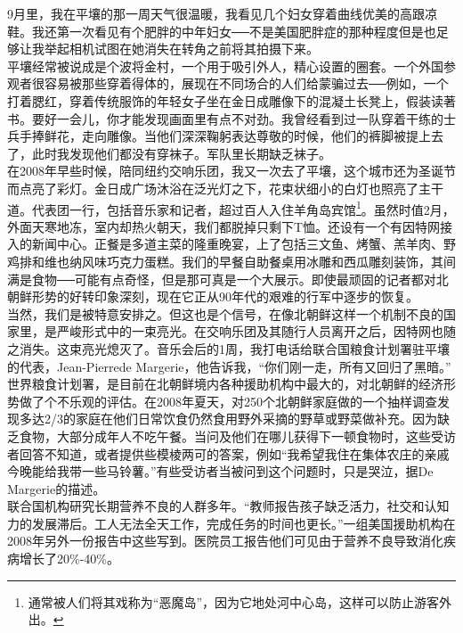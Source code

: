 9月里，我在平壤的那一周天气很温暖，我看见几个妇女穿着曲线优美的高跟凉鞋。我还第一次看见有个肥胖的中年妇女──不是美国肥胖症的那种程度但是也足够让我举起相机试图在她消失在转角之前将其拍摄下来。\\

平壤经常被说成是个波将金村，一个用于吸引外人，精心设置的圈套。一个外国参观者很容易被那些穿着得体的，展现在不同场合的人们给蒙骗过去──例如，一个打着腮红，穿着传统服饰的年轻女子坐在金日成雕像下的混凝土长凳上，假装读著书。要好一会儿，你才能发现画面里有点不对劲。我曾经看到过一队穿着干练的士兵手捧鲜花，走向雕像。当他们深深鞠躬表达尊敬的时候，他们的裤脚被提上去了，此时我发现他们都没有穿袜子。军队里长期缺乏袜子。\\

在2008年早些时候，陪同纽约交响乐团，我又一次去了平壤，这个城市还为圣诞节而点亮了彩灯。金日成广场沐浴在泛光灯之下，花束状细小的白灯也照亮了主干道。代表团一行，包括音乐家和记者，超过百人入住羊角岛宾馆\footnote{通常被人们将其戏称为“恶魔岛”，因为它地处河中心岛，这样可以防止游客外出。}。虽然时值2月，外面天寒地冻，室内却热火朝天，我们都脱掉只剩下T恤。还设有一个有因特网接入的新闻中心。正餐是多道主菜的隆重晚宴，上了包括三文鱼、烤蟹、羔羊肉、野鸡排和维也纳风味巧克力蛋糕。我们的早餐自助餐桌用冰雕和西瓜雕刻装饰，其间满是食物──可能有点奇怪，但是那可真是一个大展示。即使最顽固的记者都对北朝鲜形势的好转印象深刻，现在它正从90年代的艰难的行军中逐步的恢复。\\

当然，我们是被特意安排之。但这也是个信号，在像北朝鲜这样一个机制不良的国家里，是严峻形式中的一束亮光。在交响乐团及其随行人员离开之后，因特网也随之消失。这束亮光熄灭了。音乐会后的1周，我打电话给联合国粮食计划署驻平壤的代表，Jean-Pierrede Margerie，他告诉我，“你们刚一走，所有又回归了黑暗。”\\

世界粮食计划署，是目前在北朝鲜境内各种援助机构中最大的，对北朝鲜的经济形势做了个不乐观的评估。在2008年夏天，对250个北朝鲜家庭做的一个抽样调查发现多达2/3的家庭在他们日常饮食仍然食用野外采摘的野草或野菜做补充。因为缺乏食物，大部分成年人不吃午餐。当问及他们在哪儿获得下一顿食物时，这些受访者回答不知道，或者提供些模棱两可的答案，例如“我希望我住在集体农庄的亲戚今晚能给我带一些马铃薯。”有些受访者当被问到这个问题时，只是哭泣，据De Margerie的描述。\\

联合国机构研究长期营养不良的人群多年。“教师报告孩子缺乏活力，社交和认知力的发展滞后。工人无法全天工作，完成任务的时间也更长。”一组美国援助机构在2008年另外一份报告中这些写到。医院员工报告他们可见由于营养不良导致消化疾病增长了20\%-40\%。\\

